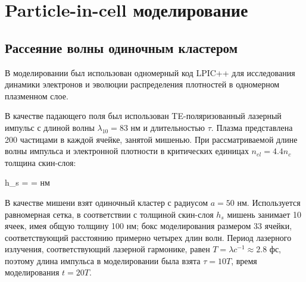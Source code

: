 \section{Particle-in-cell моделирование}

\subsection{Рассеяние волны одиночным кластером}

В моделировании был использован одномерный код LPIC++ \cite{Pfund1998} для исследования динамики электронов и эволюции распределения плотностей в одномерном плазменном слое.

В качестве падающего поля был использован TE-поляризованный лазерный импульс с длиной волны $\lambda_{10} = 83$ нм и длительностью $\tau$. Плазма представлена 200 частицами в каждой ячейке, занятой мишенью. При рассматриваемой длине волны импульса и электронной плотности в критических единицах $n_{el} = 4.4 n_c$ толщина скин-слоя:

    \eq
        h_{s} =  = \lambda {}  \textrm{ нм} 
        \label{pic_skin_single}
    \qe

В качестве мишени взят одиночный кластер с радиусом $a = 50$ нм. Используется равномерная сетка, в соответствии с толщиной скин-слоя $h_{s}$ мишень занимает 10 ячеек, имея общую толщину 100 нм; бокс моделирования размером 33 ячейки, соответствующий расстоянию примерно четырех длин волн. Период лазерного излучения, соответствующий лазерной гармонике, равен $T = \lambda c^{-1} \approx 2.8$ фс, поэтому длина импульса в моделировании была взята $\tau = 10T$, время моделирования $t = 20T$. 

    \begin{figure}[H]
        \label{lpic_low_high:image}
    \end{figure}

